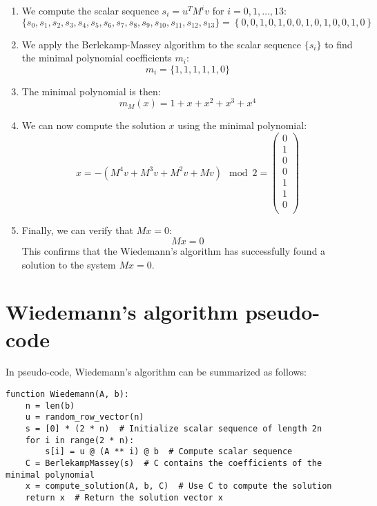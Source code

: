 \documentclass[a4paper, 11pt]{article}
\begin{document}
\begin{enumerate}
    \item We compute the scalar sequence $s_i = u^T M^i v$ for $i=0,1,\dots,13$:
    \begin{equation}
        \{s_0, s_1, s_2, s_3, s_4, s_5, s_6, s_7, s_8, s_9, s_{10}, s_{11}, s_{12}, s_{13} \} 
        = 
        \left\{0,0,1,0,1,0,0,1,0,1,0,0,1,0\right\}
    \end{equation}
    \item We apply the Berlekamp-Massey algorithm to the scalar sequence $\{s_i\}$ to find the minimal polynomial coefficients $m_i$:
    \begin{equation}
        m_i = \{1, 1, 1, 1, 1, 0\}
    \end{equation}
    \item The minimal polynomial is then:
    \begin{equation}
        m_M(x) = 1 + x + x^2 + x^3 + x^4
    \end{equation}
    \item We can now compute the solution $x$ using the minimal polynomial:
    \begin{equation}
        x = -(M^4 v + M^3 v + M^2 v + M v) \mod 2
        = \begin{pmatrix}
            0 \\
            1 \\
            0 \\
            0 \\
            1 \\
            1 \\
            0 \\
        \end{pmatrix}
    \end{equation}
    \item Finally, we can verify that $Mx = 0$:
    \begin{equation}
        Mx = 0
    \end{equation}
    This confirms that the Wiedemann's algorithm has successfully found a solution to the system $Mx = 0$.
\end{enumerate}


\newpage

\appendix

\section{Wiedemann's algorithm pseudo-code}
In pseudo-code, Wiedemann's algorithm can be summarized as follows:
\begin{verbatim}
function Wiedemann(A, b):
    n = len(b)
    u = random_row_vector(n)
    s = [0] * (2 * n)  # Initialize scalar sequence of length 2n
    for i in range(2 * n):
        s[i] = u @ (A ** i) @ b  # Compute scalar sequence
    C = BerlekampMassey(s)  # C contains the coefficients of the minimal polynomial
    x = compute_solution(A, b, C)  # Use C to compute the solution
    return x  # Return the solution vector x
\end{verbatim}
\end{document}
